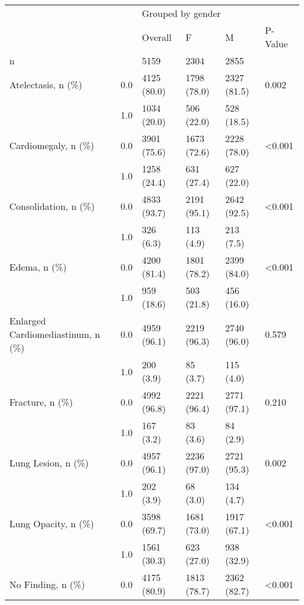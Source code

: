 \begin{tabular}{llllll}
\toprule
                       &     & \multicolumn{4}{l}{Grouped by gender} \\
                       &     &           Overall &            F &            M & P-Value \\
\midrule
n & {} &              5159 &         2304 &         2855 &         \\
Atelectasis, n (\%) & 0.0 &       4125 (80.0) &  1798 (78.0) &  2327 (81.5) &   0.002 \\
                       & 1.0 &       1034 (20.0) &   506 (22.0) &   528 (18.5) &         \\
Cardiomegaly, n (\%) & 0.0 &       3901 (75.6) &  1673 (72.6) &  2228 (78.0) &  <0.001 \\
                       & 1.0 &       1258 (24.4) &   631 (27.4) &   627 (22.0) &         \\
Consolidation, n (\%) & 0.0 &       4833 (93.7) &  2191 (95.1) &  2642 (92.5) &  <0.001 \\
                       & 1.0 &         326 (6.3) &    113 (4.9) &    213 (7.5) &         \\
Edema, n (\%) & 0.0 &       4200 (81.4) &  1801 (78.2) &  2399 (84.0) &  <0.001 \\
                       & 1.0 &        959 (18.6) &   503 (21.8) &   456 (16.0) &         \\
Enlarged Cardiomediastinum, n (\%) & 0.0 &       4959 (96.1) &  2219 (96.3) &  2740 (96.0) &   0.579 \\
                       & 1.0 &         200 (3.9) &     85 (3.7) &    115 (4.0) &         \\
Fracture, n (\%) & 0.0 &       4992 (96.8) &  2221 (96.4) &  2771 (97.1) &   0.210 \\
                       & 1.0 &         167 (3.2) &     83 (3.6) &     84 (2.9) &         \\
Lung Lesion, n (\%) & 0.0 &       4957 (96.1) &  2236 (97.0) &  2721 (95.3) &   0.002 \\
                       & 1.0 &         202 (3.9) &     68 (3.0) &    134 (4.7) &         \\
Lung Opacity, n (\%) & 0.0 &       3598 (69.7) &  1681 (73.0) &  1917 (67.1) &  <0.001 \\
                       & 1.0 &       1561 (30.3) &   623 (27.0) &   938 (32.9) &         \\
No Finding, n (\%) & 0.0 &       4175 (80.9) &  1813 (78.7) &  2362 (82.7) &  <0.001 \\

\end{tabular}
